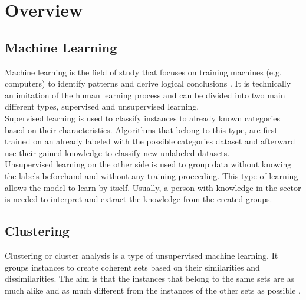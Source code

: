 \section{Overview}

\subsection{Machine Learning}
Machine learning is the field of study that focuses on training machines (e.g. computers) to identify patterns and derive logical conclusions \autocite{machDef}. It is technically an imitation of the human learning process and can be divided into two main different types, supervised and unsupervised learning. \\
Supervised learning is used to classify instances to already known categories based on their characteristics. Algorithms that belong to this type, are first trained on an already labeled with the possible categories dataset and afterward use their gained knowledge to classify new unlabeled datasets. \\
Unsupervised learning on the other side is used to group data without knowing the labels beforehand and without any training proceeding. This type of learning allows the model to learn by itself. Usually, a person with knowledge in the sector is needed to interpret and extract the knowledge from the created groups. \\

\subsection{Clustering}
Clustering or cluster analysis is a type of unsupervised machine learning. It groups instances to create coherent sets based on their similarities and dissimilarities. The aim is that the instances that belong to the same sets are as much alike and as much different from the instances of the other sets as possible \autocite{dunham, tanSteinKum}.

